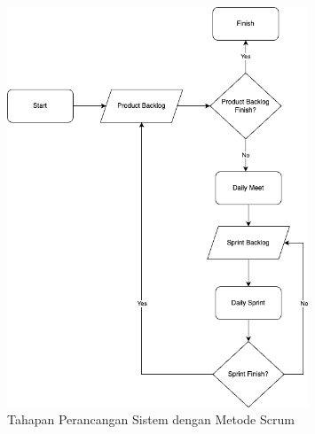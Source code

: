 \begin{figure}[H]
	\centering
	\includegraphics[width=0.8\textwidth]{gambar/scrum.png}
	\caption{Tahapan Perancangan Sistem dengan Metode Scrum}
\end{figure}

